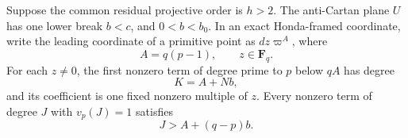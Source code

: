 \begin{lemma}
\label{lem:B-RD58-anti-signature}
Suppose the common residual projective order is $h>2$.
The anti-Cartan plane $U$ has one lower break $b<c$, and
$0<b<b_0$. In an exact Honda-framed coordinate, write the leading
coordinate of a primitive point as $d z\varpi^A$, where
\[
                     A=q(p-1),\qquad z\in\mathbf F_q.
\]
For each $z\ne0$, the first nonzero term of degree prime to $p$
below $qA$ has degree
\[
                     K=A+Nb,                            \tag{B-RD58.3}
\]
and its coefficient is one fixed nonzero multiple of $z$.
Every nonzero term of degree $J$ with $v_p(J)=1$ satisfies
\[
                     J>A+(q-p)b.                        \tag{B-RD58.4}
\]
\end{lemma}
